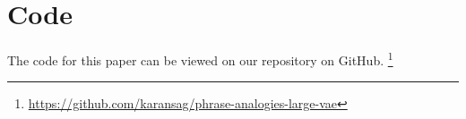 \documentclass[11pt]{article}
\begin{document}
\section{Code}

The code for this paper can be viewed on our repository on GitHub. \footnote{\href{https://github.com/karansag/phrase-analogies-large-vae}{https://github.com/karansag/phrase-analogies-large-vae}}


\nocite{li2020_Optimus, N18-1101, snli:emnlp2015, zhu-de-melo-2020-sentence, reimers2019sentencebert, vec2sent, kiros2015skipthought, conneau2018supervised, cer2018universal, conneau2018cram, kerscher2020vec2sent, Wang2020vec2sent, kingma2014autoencoding, bowman-etal-2016-generating, rezende14, raffel20t2ttransformer, conneau20unsupervised, conneau18xnli}





\end{document}
